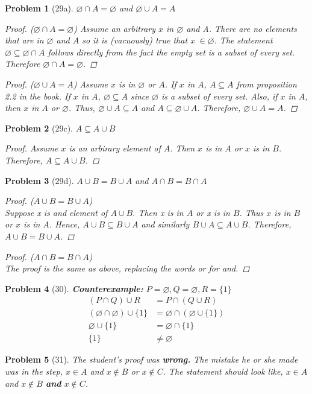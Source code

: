 \documentclass{article}
\let\emptyset\varnothing
\theoremstyle{problem}
\newtheorem{prob}{Problem}
\begin{document}
\begin{prob}[29a]
$\emptyset \cap A = \emptyset$ and $\emptyset \cup A = A$
\begin{proof}($\emptyset \cap A = \emptyset$)
Assume an arbitrary $x$ in $\emptyset$ and A. There are no elements that are in $\emptyset$ and $A$ so it is (vacuously) true that x $\in \emptyset$. The statement
$\emptyset \subseteq \emptyset \cap A$ follows directly from the fact the empty set is a subset of every set. Therefore $\emptyset \cap A = \emptyset$.
\end{proof}
\begin{proof}($\emptyset \cup A = A$)
Assume $x$ is in $\emptyset$ or $A$. If $x$ in $A$, $A \subseteq A$ from \textit{proposition 2.2} in the book. If $x$ in $A$, $\emptyset \subseteq A$ since $\emptyset$ is a subset of every set. Also, if $x$ in $A$, then $x$ in $A$ or $\emptyset$. Thus, $\emptyset \cup A \subseteq A$ and $A \subseteq \emptyset \cup A$. Therefore, $\emptyset \cup A = A$.
\end{proof}
\end{prob}

\begin{prob}[29c]
$A \subseteq A \cup B$
\begin{proof}
Assume $x$ is an arbirary element of $A$. Then $x$ is in $A$ or $x$ is in $B$. Therefore, $A \subseteq A \cup B$.
\end{proof}
\end{prob}

\begin{prob}[29d]
$A \cup B = B \cup A$ and $A \cap B = B \cap A$
\begin{proof}($A \cup B = B \cup A$)\\
Suppose x is and element of $A \cup B$. Then x is in $A$ or x is in $B$. Thus $x$ is in $B$ or $x$ is in $A$. Hence, $A \cup B \subseteq B \cup A$ and similarly $B \cup A \subseteq A \cup B$. Therefore, $A \cup B = B \cup A$.
\end{proof}
\begin{proof}($A \cap B = B \cap A$)\\
The proof is the same as above, replacing the words \textit{or} for \textit{and}.
\end{proof}
\end{prob}

\begin{prob}[30]
\textbf{Counterexample:} $P = \emptyset, Q = \emptyset, R = \{1\}$
\begin{align*}
  (P \cap Q) \cup R                     &= P \cap (Q \cup R)\\
  (\emptyset \cap \emptyset) \cup \{1\} &= \emptyset \cap (\emptyset \cup \{1\})\\
  \emptyset \cup \{1\}                  &= \emptyset \cap \{1\}\\
  \{1\}                                 &\not = \emptyset
\end{align*}
\end{prob}

\begin{prob}[31]
The student's proof was \textbf{wrong.} The mistake he or she made was in the step, $x \in A$ and $x \not \in B$ or $x \not \in C$. The statement should look like, $x \in A$ and $x \not \in B$ \textbf{and} $x \not \in C$.

\end{prob}
\end{document}

